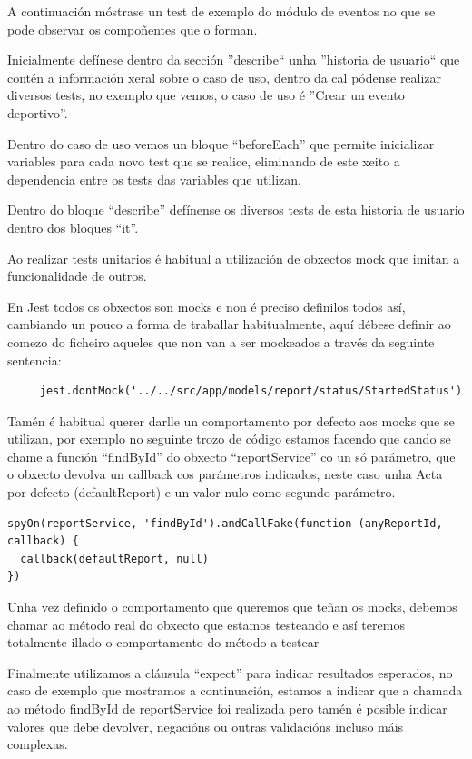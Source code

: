     A continuación móstrase un test de exemplo do módulo de eventos no que se 
pode observar os compoñentes que o forman.

    Inicialmente defínese dentro da sección ''describe`` unha ''historia de 
usuario`` que contén a información xeral sobre o caso de uso, dentro da cal 
pódense realizar diversos tests, no exemplo que vemos, o caso de uso é ''Crear 
un evento deportivo''.

    Dentro do caso de uso vemos un bloque ``beforeEach'' que permite 
inicializar variables para cada novo test que se realice, eliminando de este 
xeito a dependencia entre os tests das variables que utilizan.

    Dentro do bloque ``describe'' defínense os diversos tests de esta historia 
de usuario dentro dos bloques ``it''.

    Ao realizar tests unitarios é habitual a utilización de obxectos mock que 
imitan a funcionalidade de outros.

    En Jest todos os obxectos son mocks e non é preciso definilos todos así, 
cambiando un pouco a forma de traballar habitualmente, aquí débese definir ao 
comezo do ficheiro aqueles que non van a ser mockeados a través da 
seguinte sentencia:

    \begin{lstlisting}
     jest.dontMock('../../src/app/models/report/status/StartedStatus')
    \end{lstlisting}

    Tamén é habitual querer darlle un comportamento por defecto aos mocks que 
se utilizan, por exemplo no seguinte trozo de código estamos facendo que cando 
se chame a función ``findById'' do obxecto ``reportService''  co un só 
parámetro, que o obxecto devolva un callback cos parámetros indicados, neste 
caso unha Acta por defecto (defaultReport) e un valor nulo como segundo 
parámetro.

    \begin{lstlisting}
spyOn(reportService, 'findById').andCallFake(function (anyReportId, callback) {
  callback(defaultReport, null)
})
    \end{lstlisting}

    Unha vez definido o comportamento que queremos que teñan os mocks, debemos 
chamar ao método real do obxecto que estamos testeando e así teremos totalmente 
illado o comportamento do método a testear

    Finalmente utilizamos a cláusula ``expect'' para indicar resultados 
esperados, no caso de exemplo que mostramos a continuación, estamos a indicar 
que a chamada ao método findById de reportService foi realizada pero tamén é 
posible indicar valores que debe devolver, negacións ou outras validacións 
incluso máis complexas.

